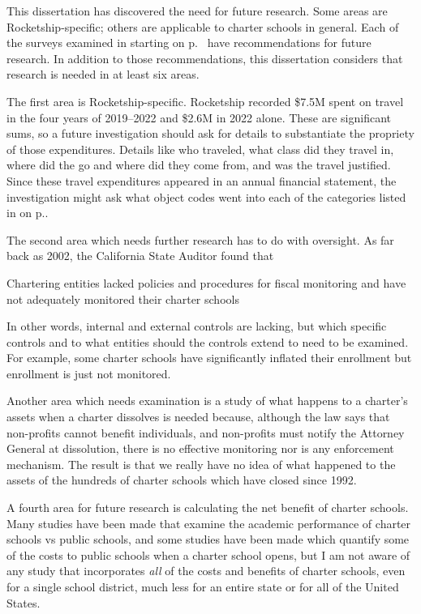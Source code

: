This dissertation has discovered the need for future research. Some areas are Rocketship-specific; others are applicable to charter schools in general. Each of the surveys examined in  starting on p.~\pageref{sec:charter-surveys} have recommendations for future research. In addition to those recommendations, this dissertation considers that research is needed in at least six areas.

The first area is Rocketship-specific. Rocketship recorded \$7.5M spent on travel in the four years of 2019–2022 and \$2.6M in 2022 alone. These are significant sums, so a future investigation should ask for details to substantiate the propriety of those expenditures. Details like who traveled, what class did they travel in, where did the go and where did they come from, and was the travel justified. Since these travel expenditures appeared in an annual financial statement, the investigation might ask what object codes went into each of the categories listed in  on p.\pageref{tab:consolidated_functional_expenses}.

The second area which needs further research has to do with oversight. As far back as 2002, the California State Auditor found that
\begin{textquote}{Chartering entities lacked policies and procedures for fiscal monitoring and have not adequately monitored their charter schools}
\end{textquote}
In other words, internal and external controls are lacking, but which specific controls and to what entities should the controls extend to need to be examined. For example, some charter schools have significantly inflated their enrollment \parencite{Taketa2021} but enrollment is just not monitored.

Another area which needs examination is a study of what happens to a charter's assets when a charter dissolves is needed because, although the law says that non-profits cannot benefit individuals, and non-profits must notify the Attorney General at dissolution, there is no effective monitoring nor is any enforcement mechanism. The result is that we really have no idea of what happened to the assets of the hundreds of charter schools which have closed since 1992.

A fourth area for future research is calculating the net benefit of charter schools. Many studies have been made that examine the academic performance of charter schools vs public schools, and some studies have been made which quantify some of the costs to public schools when a charter school opens, but I am not aware of any study that incorporates \textit{all} of the costs and benefits of charter schools, even for a single school district, much less for an entire state or for all of the United States.

